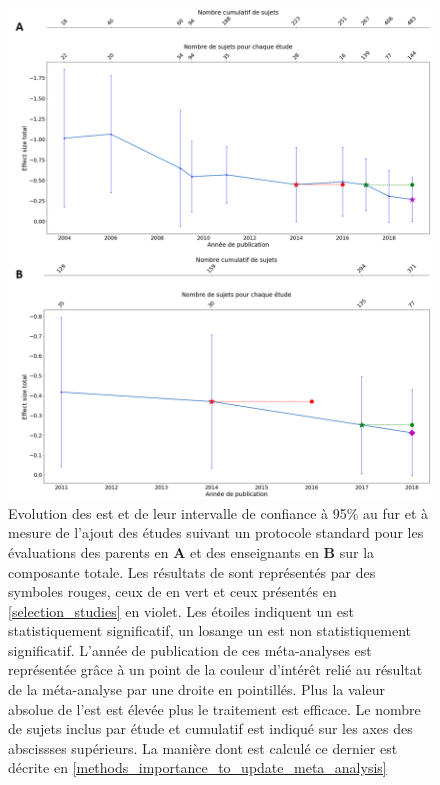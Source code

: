 \begin{figure}[h!]
  \centering
	\includegraphics[width=1\linewidth]{figures/chapter-2/meta-analysis-evolution-summary-effect-std} 
  \caption[Evolution des  au fur et à mesure de l'ajout de nouvelles études suivant un protocole standard.]{Evolution des \gls{est} et de leur 
	intervalle de confiance à 95\% au fur et à mesure de l'ajout des études suivant un protocole standard pour les évaluations des 
	parents en \textbf{A} et des enseignants en \textbf{B} sur la composante totale.
  Les résultats de \citep{Cortese2016} sont représentés par des symboles rouges, ceux de \citet{Bussalb2019clinical} en vert et ceux présentés en \ref{selection_studies} en violet. Les étoiles 
	indiquent un \gls{est} statistiquement significatif, un losange un \gls{est} non statistiquement significatif. L'année de publication de ces méta-analyses est représentée grâce à un point de la couleur 
	d'intérêt relié au résultat de la méta-analyse par une droite en pointillés.
	Plus la valeur absolue de l'\gls{est} est élevée plus le traitement est efficace.
	Le nombre de sujets inclus par étude et cumulatif est indiqué sur les axes des abscissses supérieurs. La manière dont est calculé ce dernier est 
	décrite en \ref{methods_importance_to_update_meta_analysis}}
  \label{Figure:meta_analysis_evolution_est_std}
\end{figure}

